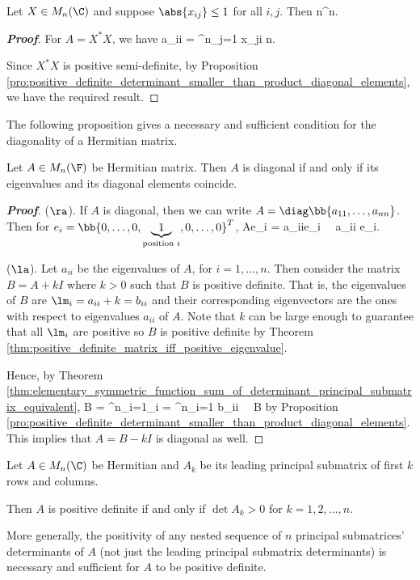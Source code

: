 \begin{corollary}\label{cor:positive_definite_determinant_smaller_than_n_power_n}
Let $X\in M_n(\C)$ and suppose $\abs{x_{ij}}\leq 1$ for all $i,j$. Then
\be
\det{} \leq n^n.
\ee
\end{corollary}

\begin{proof}[\bf Proof]
For $A = X^*X$, we have
\be
a_{ii} = \sum^n_{j=1}  x_{ji} \leq n.
\ee

Since $X^*X$ is positive semi-definite, by Proposition \ref{pro:positive_definite_determinant_smaller_than_product_diagonal_elements}, we have the required result. 
\end{proof}

The following proposition gives a necessary and sufficient condition for the diagonality of a Hermitian matrix.

\begin{proposition}
Let $A\in M_n(\F)$ be Hermitian matrix. Then $A$ is diagonal if and only if its eigenvalues and its diagonal elements coincide.
\end{proposition}

\begin{proof}[\bf Proof]
($\ra$). If $A$ is diagonal, then we can write $A=\diag\bb{a_{11},\dots,a_{nn}}$. Then for $e_i = \bb{0,\dots,0,\underbrace{1}_{\text{position }i},0,\dots,0}^T$,
\be
Ae_i = a_{ii}e_i \ \ra\ a_{ii} e_i.
\ee

($\la$). Let $a_{ii}$ be the eigenvalues of $A$, for $i=1,\dots,n$. Then consider the matrix $B = A + kI$ where $k>0$ such that $B$ is positive definite. That is, the eigenvalues of $B$ are $\lm_i = a_{ii}+k = b_{ii}$ and their corresponding eigenvectors are the ones with respect to eigenvalues $a_{ii}$ of $A$. Note that $k$ can be large enough to guarantee that all $\lm_i$ are positive so $B$ is positive definite by Theorem \ref{thm:positive_definite_matrix_iff_positive_eigenvalue}.

Hence, by Theorem \ref{thm:elementary_symmetric_function_sum_of_determinant_principal_submatrix_equivalent},
\be
\det B = \prod^n_{i=1}\lm_i = \prod^n_{i=1} b_{ii} \ \ra\ B
\ee
by Proposition \ref{pro:positive_definite_determinant_smaller_than_product_diagonal_elements}. This implies that $A = B- kI$ is diagonal as well.
\end{proof}



\begin{theorem}\label{thm:positive_definite_iff_leading_principal_submatrices_determinants}
Let $A\in M_n(\C)$ be Hermitian and $A_k$ be its leading principal submatrix of first $k$ rows and columns.

Then $A$ is positive definite if and only if $\det A_k > 0$ for $k=1,2,\dots,n$.

More generally, the positivity of any nested sequence of $n$ principal submatrices' determinants of $A$ (not just the leading principal submatrix determinants) is necessary and sufficient for $A$ to be positive definite.
\end{theorem}

